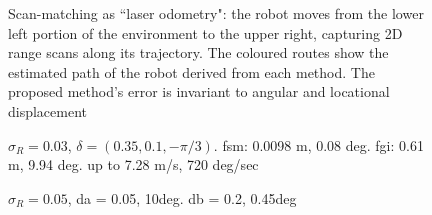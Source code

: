 \begin{figure}[]\centering
  
  \vspace{-2cm}
  \caption{\small Scan-matching as ``laser odometry": the robot moves from the
           lower left portion of the environment to the upper right, capturing
           2D range scans along its trajectory. The coloured routes show the
           estimated path of the robot derived from each method. The proposed
           method's error is invariant to angular and locational displacement}
  \label{}
\end{figure}

\begin{figure}[]\centering
  
  \caption{$\sigma_R = 0.03$, $\delta = (0.35, 0.1, -\pi/3)$. fsm: 0.0098 m, 0.08 deg.
  fgi: 0.61 m, 9.94 deg. up to 7.28 m/s, 720 deg/sec}
  \label{}
\end{figure}

\begin{figure}[]\centering
  
  \caption{$\sigma_R = 0.05$, da = 0.05, 10deg. db = 0.2, 0.45deg}
  \label{}
\end{figure}
